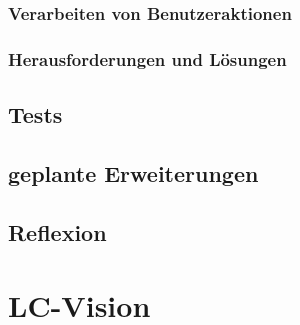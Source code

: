 \documentclass[10pt,a4paper]{article}
\begin{document}
\subsubsection{Verarbeiten von Benutzeraktionen}
\subsubsection{Herausforderungen und Lösungen}
\subsection{Tests}
\subsection{geplante Erweiterungen}
\subsection{Reflexion}

\section{LC-Vision}
\end{document}
